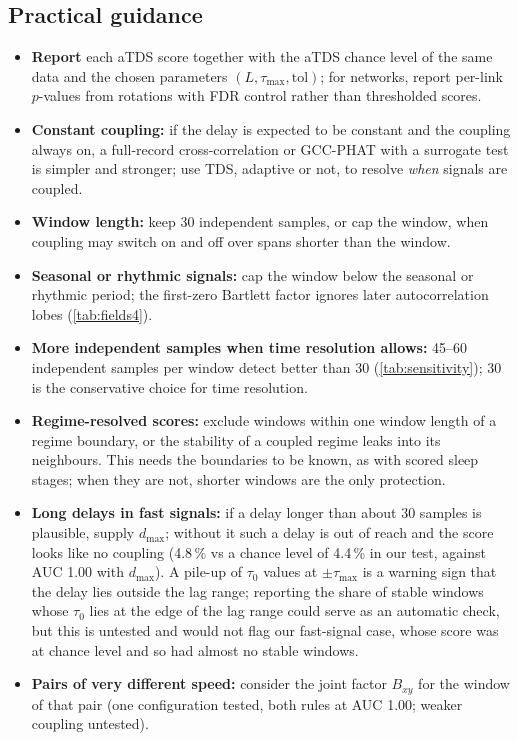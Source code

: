 \documentclass[11pt,a4paper]{article}
\begin{document}
\subsection*{Practical guidance}
\label{sec:guidance}
\begin{itemize}
\item \textbf{Report} each aTDS score together with the aTDS chance level of the same data and the chosen parameters $(L, \tau_{\max}, \mathrm{tol})$; for networks, report per-link $p$-values from rotations with FDR control rather than thresholded scores.
\item \textbf{Constant coupling:} if the delay is expected to be constant and the coupling always on, a full-record cross-correlation or GCC-PHAT with a surrogate test is simpler and stronger; use TDS, adaptive or not, to resolve \emph{when} signals are coupled.
\item \textbf{Window length:} keep 30 independent samples, or cap the window, when coupling may switch on and off over spans shorter than the window.
\item \textbf{Seasonal or rhythmic signals:} cap the window below the seasonal or rhythmic period; the first-zero Bartlett factor ignores later autocorrelation lobes (\cref{tab:fields4}).
\item \textbf{More independent samples when time resolution allows:} 45--60 independent samples per window detect better than 30 (\cref{tab:sensitivity}); 30 is the conservative choice for time resolution.
\item \textbf{Regime-resolved scores:} exclude windows within one window length of a regime boundary, or the stability of a coupled regime leaks into its neighbours. This needs the boundaries to be known, as with scored sleep stages; when they are not, shorter windows are the only protection.
\item \textbf{Long delays in fast signals:} if a delay longer than about 30 samples is plausible, supply $d_{\max}$; without it such a delay is out of reach and the score looks like no coupling (4.8\,\% vs a chance level of 4.4\,\% in our test, against AUC 1.00 with $d_{\max}$). A pile-up of $\tau_0$ values at $\pm\tau_{\max}$ is a warning sign that the delay lies outside the lag range; reporting the share of stable windows whose $\tau_0$ lies at the edge of the lag range could serve as an automatic check, but this is untested and would not flag our fast-signal case, whose score was at chance level and so had almost no stable windows.
\item \textbf{Pairs of very different speed:} consider the joint factor $B_{xy}$ for the window of that pair (one configuration tested, both rules at AUC 1.00; weaker coupling untested).

\end{itemize}
\end{document}
